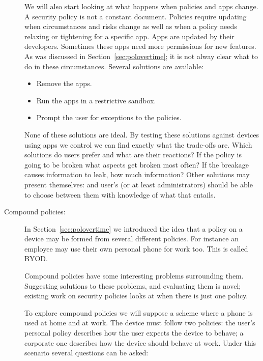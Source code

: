 \documentclass[a4paper]{article}
\begin{document}
\begin{description}
    We will also start looking at what happens when policies and apps change.  A security
    policy is not a constant document.  Policies require updating when
    circumstances and risks change as well as when a policy needs relaxing or
    tightening for a specific app. Apps are updated by their developers.
    Sometimes these apps need more permissions for new features.  As was discussed in
    Section~\ref{sec:polovertime}; it is not alway clear what to do in these
    circumstances. Several solutions are available:

    \begin{itemize}
      \item Remove the apps.
      \item Run the apps in a restrictive sandbox.
      \item Prompt the user for exceptions to the policies.
    \end{itemize}

    None of these solutions are ideal. By testing these solutions against
    devices using apps we control we can find exactly what the trade-offs are.
    Which solutions do users prefer and what are their reactions?  If the policy
    is going to be broken what aspects get broken most often?  If the breakage
    causes information to leak, how much information?  Other solutions may
    present themselves: and user's (or at least administrators) should be able
    to choose between them with knowledge of what that entails.
    
  \item[Compound policies:] In Section~\ref{sec:polovertime} we introduced the idea that a policy on a
    device may be formed from several different policies.  For instance an
    employee may use their own personal phone for work too.  This is called
    \ac{BYOD}.
    
    Compound policies have some interesting problems surrounding them.
    Suggesting solutions to these problems, and evaluating them is novel;
    existing work on security policies looks at when there is just one policy.

    To explore compound policies we will suppose a scheme where a phone is used
    at home and at work.  The device must follow two policies: the user's
    personal policy describes how the user expects the device to behave; a
    corporate one describes how the device should behave at work.  Under this
    scenario several questions can be asked:

    \begin{itemize}
    

\end{itemize}
\end{description}
\end{document}
